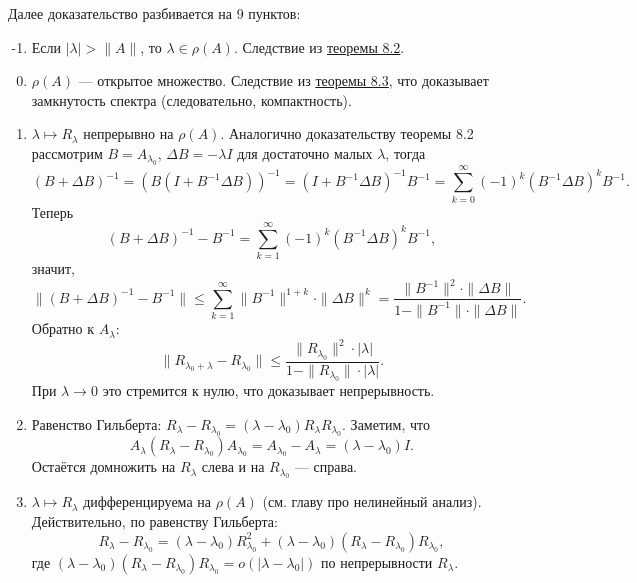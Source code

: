 \documentclass[12pt, a4paper]{article}
\renewcommand{\le}{\leqslant}  %
\begin{document}
Далее доказательство разбивается на 9 пунктов:
\begin{enumerate}
    \setcounter{enumi}{-2}
    \item Если $|\lambda| > \|A\|$, то $\lambda \in \rho(A)$.
        Следствие из \hyperref[th:8-2]{теоремы 8.2}.

    \item $\rho(A)$ --- открытое множество.
        Следствие из \hyperref[th:8-3]{теоремы 8.3}, что доказывает замкнутость спектра (следовательно, компактность).

    \item $\lambda \mapsto R_\lambda$ непрерывно на $\rho(A)$.
        Аналогично доказательству теоремы 8.2 рассмотрим $B = A_{\lambda_0}$, $\Delta B = -\lambda I$ для достаточно малых $\lambda$, тогда
        \[
            (B + \Delta B)^{-1} = (B(I + B^{-1} \Delta B))^{-1} = (I + B^{-1} \Delta B)^{-1}B^{-1} = \sum_{k=0}^{\infty} (-1)^k  (B^{-1} \Delta B)^k B^{-1}.
        \]
        Теперь
        \[
            (B + \Delta B)^{-1} - B^{-1} = \sum_{k=1}^{\infty} (-1)^k (B^{-1} \Delta B)^k B^{-1},
        \]
        значит,
        \[
            \|(B + \Delta B)^{-1} - B^{-1}\| \le \sum_{k=1}^{\infty} \|B^{-1}\|^{1 + k} \cdot \|\Delta B\|^k = \frac{\|B^{-1}\|^2 \cdot \|\Delta B\|}{1 - \|B^{-1}\| \cdot \|\Delta B\|}.
        \]
        Обратно к $A_\lambda$:
        \[
            \|R_{\lambda_0 + \lambda} - R_{\lambda_0}\| \le \frac{\|R_{\lambda_0}\|^2 \cdot |\lambda|}{1 - \|R_{\lambda_0}\| \cdot |\lambda|}.
        \]
        При $\lambda \to 0$ это стремится к нулю, что доказывает непрерывность.

    \item Равенство Гильберта: $R_\lambda - R_{\lambda_0} = (\lambda - \lambda_0) R_\lambda R_{\lambda_0}$.
        Заметим, что
        \[
            A_{\lambda} (R_\lambda - R_{\lambda_0}) A_{\lambda_0} = A_{\lambda_0} - A_{\lambda} = (\lambda - \lambda_0) I.
        \]
        Остаётся домножить на $R_\lambda$ слева и на $R_{\lambda_0}$ --- справа.

    \item $\lambda \mapsto R_\lambda$ дифференцируема на $\rho(A)$ (см. главу про нелинейный анализ). Действительно, по равенству Гильберта:
        \[
            R_\lambda - R_{\lambda_0} = (\lambda - \lambda_0) R_{\lambda_0}^2 + (\lambda - \lambda_0) (R_\lambda - R_{\lambda_0}) R_{\lambda_0},
        \]
        где $(\lambda - \lambda_0) (R_\lambda - R_{\lambda_0}) R_{\lambda_0} = o(|\lambda - \lambda_0|)$ по непрерывности $R_\lambda$.


\end{enumerate}
\end{document}
